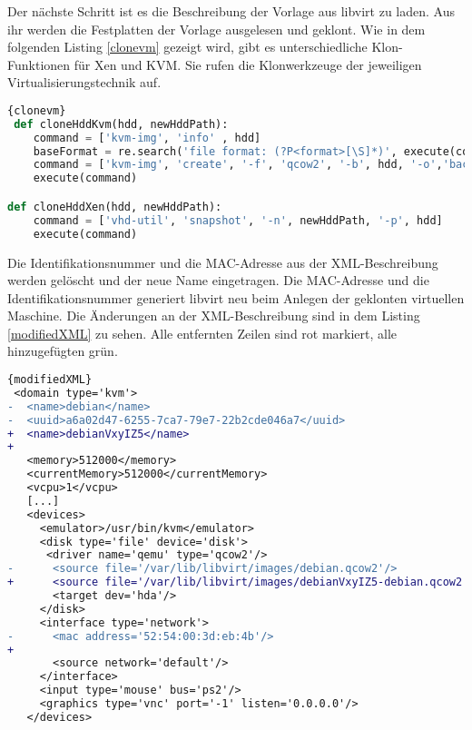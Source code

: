 Der nächste Schritt ist es die Beschreibung der Vorlage aus libvirt zu laden. Aus ihr werden die Festplatten der Vorlage ausgelesen und geklont. Wie in dem folgenden Listing \ref{clonevm} gezeigt wird, gibt es unterschiedliche Klon-Funktionen für Xen und KVM. Sie rufen die Klonwerkzeuge der jeweiligen Virtualisierungstechnik auf.
\\
\begin{lstlisting}[caption=Klonfunktionen für Xen und KVM (clone.py),language=Python, label=clonevm]{clonevm}
 def cloneHddKvm(hdd, newHddPath):
	command = ['kvm-img', 'info' , hdd]
	baseFormat = re.search('file format: (?P<format>[\S]*)', execute(command)).groupdict()['format']
	command = ['kvm-img', 'create', '-f', 'qcow2', '-b', hdd, '-o','backing_fmt=' + baseFormat, newHddPath]
	execute(command)

def cloneHddXen(hdd, newHddPath):
	command = ['vhd-util', 'snapshot', '-n', newHddPath, '-p', hdd]
	execute(command)
\end{lstlisting}

Die Identifikationsnummer und die MAC-Adresse aus der XML-Beschreibung werden gelöscht und der neue Name eingetragen. Die MAC-Adresse und die Identifikationsnummer generiert libvirt neu beim Anlegen der geklonten virtuellen Maschine. Die Änderungen an der XML-Beschreibung sind in dem Listing \ref{modifiedXML} zu sehen. Alle entfernten Zeilen sind rot markiert, alle hinzugefügten grün.
\\
\begin{lstlisting}[caption=modifizierte XML-Beschreibung,language=diff,label=modifiedXML]{modifiedXML}
 <domain type='kvm'>
-  <name>debian</name>
-  <uuid>a6a02d47-6255-7ca7-79e7-22b2cde046a7</uuid>
+  <name>debianVxyIZ5</name>
+  
   <memory>512000</memory>
   <currentMemory>512000</currentMemory>
   <vcpu>1</vcpu>
   [...]
   <devices>
     <emulator>/usr/bin/kvm</emulator>
     <disk type='file' device='disk'>
      <driver name='qemu' type='qcow2'/>
-      <source file='/var/lib/libvirt/images/debian.qcow2'/>
+      <source file='/var/lib/libvirt/images/debianVxyIZ5-debian.qcow2'/>
       <target dev='hda'/>
     </disk>
     <interface type='network'>
-      <mac address='52:54:00:3d:eb:4b'/>
+      
       <source network='default'/>
     </interface>
     <input type='mouse' bus='ps2'/>
     <graphics type='vnc' port='-1' listen='0.0.0.0'/>
   </devices>
\end{lstlisting}

